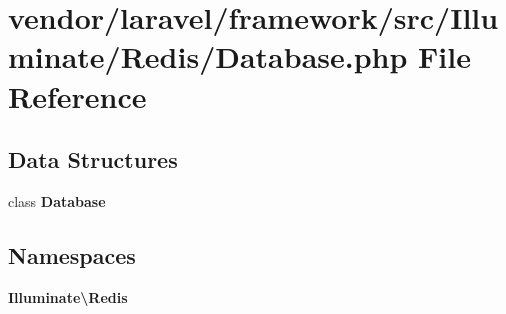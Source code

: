 \section{vendor/laravel/framework/src/\+Illuminate/\+Redis/\+Database.php File Reference}
\label{vendor_2laravel_2framework_2src_2_illuminate_2_redis_2database_8php}
\subsection*{Data Structures}
\begin{DoxyCompactItemize}
\item 
class {\bf Database}
\end{DoxyCompactItemize}
\subsection*{Namespaces}
\begin{DoxyCompactItemize}
\item 
 {\bf Illuminate\textbackslash{}\+Redis}
\end{DoxyCompactItemize}
